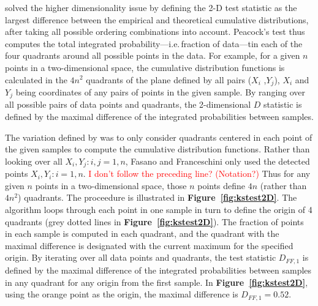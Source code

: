 \documentclass[codesnippet]{jss}
\newcommand{\RBnote}[1]{\textcolor{red}{#1}}
\begin{document}
\cite{Peacock1983} solved the higher dimensionality issue by defining
the 2-D test statistic as the largest difference between the empirical
and theoretical cumulative distributions, after taking all possible
ordering combinations into account. Peacock's test thus computes the
total integrated probability---i.e.\,fraction of data---tin each of
the four quadrants around all possible points in the data. For
example, for a given $n$ points in a two-dimensional space, the
cumulative distribution functions is calculated in the $4n^2$
quadrants of the plane defined by all pairs ($X_i$ ,$Y_j$), $X_i$ and
$Y_j$ being coordinates of any pairs of points in the given sample. By
ranging over all possible pairs of data points and quadrants, the
2-dimensional $D$ statistic is defined by the maximal difference of
the integrated probabilities between samples.

The variation defined by \cite{Fasano1987}  was to only consider
quadrants centered in each point of the given samples to compute the
cumulative distribution functions.  Rather than looking over all 
$X_i, Y_j: i,j={1,n}$, Fasano and Franceschini only used the detected points
$X_i, Y_i : i={1,n}$. 
\RBnote{I don't follow the preceding line? (Notation?)}
Thus for any given $n$ points in a two-dimensional space, those $n$ points define $4n$ (rather than
$4n^2$) quadrants.  The proceedure is illustrated in \textbf{Figure~\ref{fig:kstest2D}}.
The algorithm loops through each point in one sample in turn to define
the origin of 4 quadrants (grey dotted lines in
\textbf{Figure~\ref{fig:kstest2D}}). The fraction of points in each
sample is computed in each quadrant, and the quadrant with the maximal
difference is designated with the current maximum for the specified
origin. By iterating over all data points and quadrants, the test
statistic $D_{FF,1}$ is defined by the maximal difference of the
integrated probabilities between samples in any quadrant for any
origin from the first sample.  In \textbf{Figure~\ref{fig:kstest2D}},
using the orange point as the origin, the maximal difference is
$D_{FF,1} = 0.52$.
\end{document}
